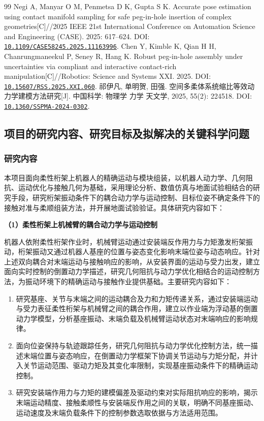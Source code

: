 \documentclass[UTF8,a4paper,zihao=-4,fontset=fandol]{ctexart}
\newcommand{\topic}[1]{\par\addvspace{0.5em}\noindent\textbf{#1}\par\nobreak}
\newcommand{\doi}[1]{\href{https://doi.org/#1}{\nolinkurl{#1}}}
\begin{document}
\begin{thebibliography}{99}
 Negi A, Manyar O M, Penmetsa D K, Gupta S K. Accurate pose estimation using contact manifold sampling for safe peg-in-hole insertion of complex geometries[C]//2025 IEEE 21st International Conference on Automation Science and Engineering (CASE). 2025: 617--624. DOI: \doi{10.1109/CASE58245.2025.11163996}.
 Chen Y, Kimble K, Qian H H, Chanrungmaneekul P, Seney R, Hang K. Robust peg-in-hole assembly under uncertainties via compliant and interactive contact-rich manipulation[C]//Robotics: Science and Systems XXI. 2025. DOI: \doi{10.15607/RSS.2025.XXI.060}.
 祁伊凡, 单明贺, 田强. 空间多柔体系统缩比等效动力学建模方法研究[J]. 中国科学: 物理学 力学 天文学, 2025, 55(2): 224518. DOI: \doi{10.1360/SSPMA-2024-0302}.
\end{thebibliography}
\endgroup

\subsection{项目的研究内容、研究目标及拟解决的关键科学问题}

\subsubsection{研究内容}

本项目面向柔性桁架上机器人的精确运动与模块组装，以机器人动力学、几何阻抗、运动优化与接触几何为基础，采用理论分析、数值仿真与地面试验相结合的研究手段，研究桁架振动条件下的耦合动力学与运动控制、目标位姿不确定条件下的接触对准与柔顺组装方法，并开展地面试验验证。具体研究内容如下：

\topic{（1）柔性桁架上机械臂的耦合动力学与运动控制}

机器人依附柔性桁架作业时，机械臂运动通过安装端反作用力与力矩激发桁架振动，桁架振动又通过机器人基座的位置与姿态变化影响末端位姿与动态响应。针对上述双向耦合对末端运动与接触响应的影响，从安装界面的运动与受力出发，建立面向实时控制的倒置动力学描述，研究几何阻抗与动力学优化相结合的运动控制方法，为振动环境下的精确运动与接触作业提供基础。主要研究内容如下：
\begin{enumerate}[label=\arabic*)]
 \item 研究基座、关节与末端之间的运动耦合及力和力矩传递关系，通过安装端运动与受力表征柔性桁架与机械臂之间的耦合作用，建立以作业端为浮动基的倒置动力学模型，分析基座振动、末端负载及机械臂运动状态对末端响应的影响规律。
 \item 面向位姿保持与轨迹跟踪任务，研究几何阻抗与动力学优化控制方法，统一描述末端位置与姿态响应，在倒置动力学框架下协调关节运动与力矩分配，并计入关节运动范围、驱动力矩及其变化率限制，实现基座振动条件下的精确运动控制。
 \item 研究安装端作用力与力矩的建模偏差及驱动约束对实际阻抗响应的影响，揭示末端运动精度、接触柔顺性与安装端反作用之间的关联，明确不同基座振动、运动速度及末端负载条件下的控制参数选取依据与方法适用范围。
\end{enumerate}
\end{document}
